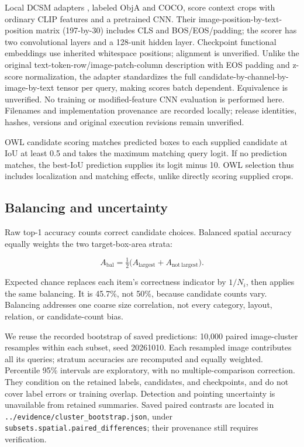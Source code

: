 \documentclass[10pt,twocolumn,letterpaper]{article}
\begin{document}
Local DCSM adapters \citep{kang2025dcsm}, labeled ObjA and COCO, score
context crops with ordinary CLIP features and a pretrained CNN. Their
image-position-by-text-position matrix (197-by-30) includes CLS and
BOS/EOS/padding; the scorer has two convolutional layers and a 128-unit
hidden layer. Checkpoint functional embeddings use inherited whitespace
positions; alignment is unverified. Unlike the original
text-token-row/image-patch-column description with EOS padding and
z-score normalization, the adapter standardizes the full
candidate-by-channel-by-image-by-text tensor per query, making scores
batch dependent. Equivalence is unverified. No training or
modified-feature CNN evaluation is performed here. Filenames and
implementation provenance are recorded locally; release identities,
hashes, versions and original execution revisions remain unverified.

OWL candidate scoring matches predicted boxes to each supplied candidate
at IoU at least 0.5 and takes the maximum matching query logit. If no
prediction matches, the best-IoU prediction supplies its logit minus 10.
OWL selection thus includes localization and matching effects, unlike
directly scoring supplied crops.

\subsection{Balancing and uncertainty}\label{balancing-and-uncertainty}

Raw top-1 accuracy counts correct candidate choices. Balanced spatial
accuracy equally weights the two target-box-area strata:

\[
A_{\mathrm{bal}}=\tfrac12\big(A_{\mathrm{largest}}+A_{\mathrm{not\ largest}}\big).
\]

Expected chance replaces each item's correctness indicator by \(1/N_i\),
then applies the same balancing. It is 45.7\%, not 50\%, because
candidate counts vary. Balancing addresses one coarse size correlation,
not every category, layout, relation, or candidate-count bias.

We reuse the recorded bootstrap of saved predictions: 10,000 paired
image-cluster resamples within each subset, seed 20261010. Each
resampled image contributes all its queries; stratum accuracies are
recomputed and equally weighted. Percentile 95\% intervals are
exploratory, with no multiple-comparison correction. They condition on
the retained labels, candidates, and checkpoints, and do not cover label
errors or training overlap. Detection and pointing uncertainty is
unavailable from retained summaries. Saved paired contrasts are located
in \texttt{../evidence/cluster\_bootstrap.json}, under
\texttt{subsets.spatial.paired\_differences}; their provenance still
requires verification.
\end{document}
